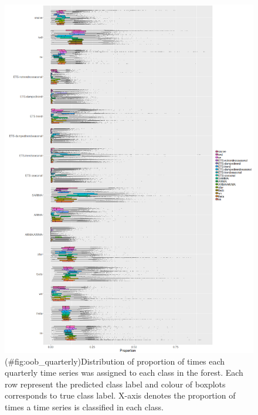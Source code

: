 \documentclass[11pt,a4paper,]{article}
\theoremstyle{definition}
\theoremstyle{definition}
\theoremstyle{definition}
\theoremstyle{remark}
\begin{document}
\newpage

\begin{figure}
\centering
\includegraphics{figures/oob_quarterly-1.png}
\caption{(\#fig:oob\_quarterly)Distribution of proportion of times each
quarterly time series was assigned to each class in the forest. Each row
represent the predicted class label and colour of boxplots corresponds
to true class label. X-axis denotes the proportion of times a time
series is classified in each class.}
\end{figure}

\newpage
\end{document}
